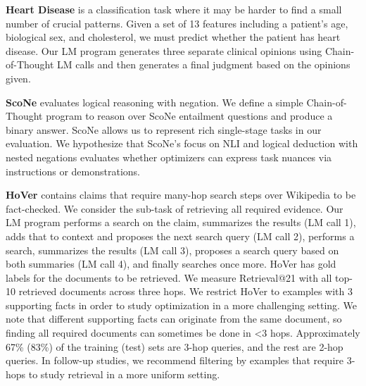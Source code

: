\textbf{Heart Disease} \cite{Detrano1989InternationalAO} is a classification task where it may be harder to find a small number of crucial patterns. Given a set of 13 features including a patient's age, biological sex, and cholesterol, we must predict whether the patient has heart disease. Our LM program generates three separate clinical opinions using Chain-of-Thought LM calls and then generates a final judgment based on the opinions given.

\textbf{ScoNe} \citep{she-etal-2023-scone} evaluates logical reasoning with negation. We define a simple Chain-of-Thought program to reason over ScoNe entailment questions and produce a binary answer. %
ScoNe allows us to represent rich single-stage tasks in our evaluation. We hypothesize that ScoNe's focus on NLI and logical deduction with nested negations evaluates whether optimizers can express task nuances via instructions or demonstrations.

\textbf{HoVer} \citep{jiang-etal-2020-hover} contains claims that require many-hop search steps over Wikipedia to be fact-checked. We consider the sub-task of retrieving all required evidence. Our LM program performs a search on the claim, summarizes the results (LM call 1), adds that to context and proposes the next search query (LM call 2), performs a search, summarizes the results (LM call 3), proposes a search query based on both summaries (LM call 4), and finally searches once more. HoVer has gold labels for the documents to be retrieved. We measure Retrieval@21 with all top-10 retrieved documents across three hops. We restrict HoVer to examples with 3 supporting facts in order to study optimization in a more challenging setting. We note that different supporting facts can originate from the same document, so finding all required documents can sometimes be done in <3 hops. Approximately 67\% (83\%) of the training (test) sets are 3-hop queries, and the rest are 2-hop queries. In follow-up studies, we recommend filtering by examples that require 3-hops to study retrieval in a more uniform setting.

